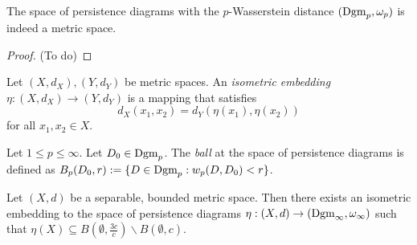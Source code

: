 \begin{proposition}
    The space of persistence diagrams with the $p$-Wasserstein distance $(\operatorname{Dgm}_p, \omega_p)$ is indeed a metric space.
\end{proposition}
\begin{proof}
    (To do)
\end{proof}

\begin{definition}
    Let $ (X, d_X), (Y, d_Y) $ be metric spaces. An {\it isometric embedding} $ \eta: (X, d_X) \to (Y, d_Y) $ is a mapping that satisfies
    $$
        d_X(x_1, x_2) = d_Y(\eta(x_1), \eta(x_2))
    $$
    for all $x_1, x_2 \in X$.
\end{definition}

\begin{definition}[Ball]
    Let $ 1\leq p \leq \infty $. Let $ D_0 \in \operatorname{Dgm}_p $. The {\it ball} at the space of persistence diagrams is defined as $ B_p(D_0, r) := \{D \in \operatorname{Dgm}_p : w_p(D, D_0) < r \} $.
\end{definition}

\begin{theorem}
    Let $ (X, d) $ be a separable, bounded metric space. Then there exists an isometric embedding to the space of persistence diagrams $ \eta: (X, d) \to (\operatorname{Dgm}_\infty, \omega_\infty)$ such that $ \eta(X) \subseteq B(\emptyset, \frac{3c}{c}) \backslash B(\emptyset, c) $.
\end{theorem}

